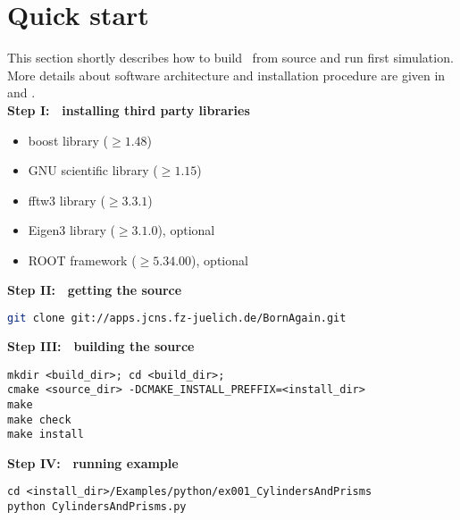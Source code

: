 \newpage
\section{Quick start} 

This section shortly describes how to build \BornAgain\ from source and run first
simulation. More details about software architecture and installation
procedure are given in  and . \\

\noindent
{\bf Step I: $~$ installing third party libraries}
\begin{itemize}
\item boost library ($\geq 1.48$)
\item GNU scientific library ($\geq 1.15$)
\item fftw3 library ($\geq 3.3.1$)
\item Eigen3 library ($\geq 3.1.0$), optional
\item ROOT framework ($\geq 5.34.00$), optional
\end{itemize}
\vspace*{2mm}


\noindent
{\bf Step II: $~$ getting the source}
\begin{lstlisting}[language=bash, style=commandline]
git clone git://apps.jcns.fz-juelich.de/BornAgain.git 
\end{lstlisting}
\vspace*{3mm}


\noindent
{\bf Step III: $~$ building the source}
\begin{lstlisting}[language=shell, style=commandline]
mkdir <build_dir>; cd <build_dir>;
cmake <source_dir> -DCMAKE_INSTALL_PREFFIX=<install_dir>
make
make check
make install
\end{lstlisting}
\vspace*{3mm}


\noindent
{\bf Step IV: $~$ running example}
\begin{lstlisting}[language=shell, style=commandline]
cd <install_dir>/Examples/python/ex001_CylindersAndPrisms
python CylindersAndPrisms.py
\end{lstlisting}




